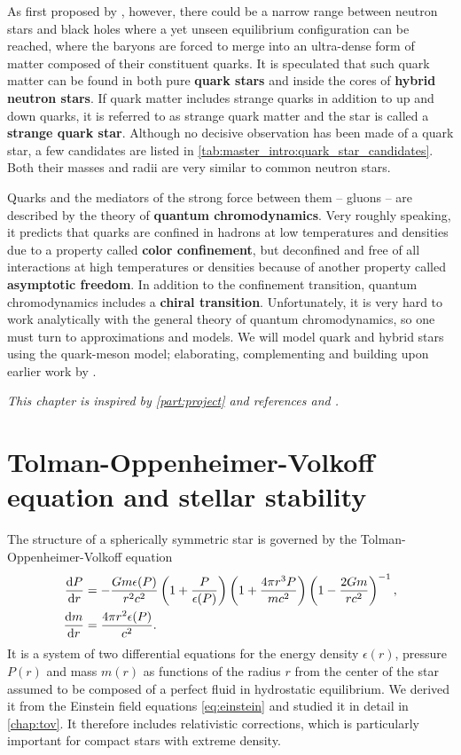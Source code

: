 As first proposed by \cite{ref:quark_star_proposition_1}, however,
there could be a narrow range between neutron stars and black holes where a yet unseen equilibrium configuration can be reached,
where the baryons are forced to merge into an ultra-dense form of matter composed of their constituent quarks.
It is speculated that such quark matter can be found in both pure \textbf{quark stars} and inside the cores of \textbf{hybrid neutron stars}.
If quark matter includes strange quarks in addition to up and down quarks, it is referred to as strange quark matter and the star is called a \textbf{strange quark star}.
Although no decisive observation has been made of a quark star,
a few candidates are listed in \cref{tab:master_intro:quark_star_candidates}.
Both their masses and radii are very similar to common neutron stars.

Quarks and the mediators of the strong force between them -- gluons -- are described by the theory of \textbf{quantum chromodynamics}.
Very roughly speaking, it predicts that quarks are confined in hadrons at low temperatures and densities due to a property called \textbf{color confinement},
but deconfined and free of all interactions at high temperatures or densities because of another property called \textbf{asymptotic freedom}.
In addition to the confinement transition, quantum chromodynamics includes a \textbf{chiral transition}.
Unfortunately, it is very hard to work analytically with the general theory of quantum chromodynamics,
so one must turn to approximations and models.
We will model quark and hybrid stars using the quark-meson model;
elaborating, complementing and building upon earlier work by \cite{ref:master_berge}.

\textit{This chapter is inspired by \cref{part:project} and references \cite{ref:glendenning} and \cite{ref:schwartz}.}

\section{Tolman-Oppenheimer-Volkoff equation and stellar stability}
\label{sec:master_intro:tov}

The structure of a spherically symmetric star is governed by the Tolman-Oppenheimer-Volkoff equation
\begin{subequations}
\begin{align}
	\odv{P}{r} &= -\frac{G m \epsilon(P)}{r^2 c^2} \left( 1 + \frac{P}{\epsilon(P)} \right) \left( 1 + \frac{4 \pi r^3 P}{m c^2} \right) \left( 1 - \frac{2 G m}{r c^2} \right)^{-1} , \\
	\odv{m}{r} &= \frac{4 \pi r^2 \epsilon(P)}{c^2} .
\end{align}%
\label{eq:master_intro:tov}%
\end{subequations}%
It is a system of two differential equations for the energy density $\epsilon(r)$, pressure $P(r)$ and mass $m(r)$ as functions of the radius $r$ from the center of the star assumed to be composed of a perfect fluid in hydrostatic equilibrium.
We derived it from the Einstein field equations \eqref{eq:einstein} and studied it in detail in \cref{chap:tov}.
It therefore includes relativistic corrections, which is particularly important for compact stars with extreme density.

